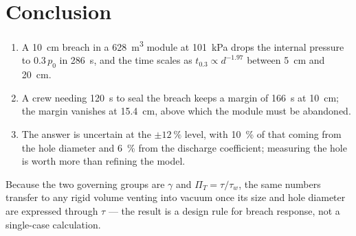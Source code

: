\section{Conclusion}
\label{sec:conclusion}

\begin{enumerate}[label=(\arabic*),leftmargin=*]
  \item A \SI{10}{cm} breach in a \SI{628}{m^3} module at \SI{101}{kPa}
        drops the internal pressure to $0.3\,p_0$ in \SI{286}{s}, and the
        time scales as $t_{0.3}\propto d^{-1.97}$ between \SI{5}{cm} and
        \SI{20}{cm}.
  \item A crew needing \SI{120}{s} to seal the breach keeps a margin of
        \SI{166}{s} at \SI{10}{cm}; the margin vanishes at
        \SI{15.4}{cm}, above which the module must be abandoned.
  \item The answer is uncertain at the $\pm\SI{12}{\percent}$ level, with
        \SI{10}{\percent} of that coming from the hole diameter and
        \SI{6}{\percent} from the discharge coefficient; measuring the
        hole is worth more than refining the model.
\end{enumerate}

Because the two governing groups are $\gamma$ and $\Pi_T=\tau/\tau_w$, the
same numbers transfer to any rigid volume venting into vacuum once its
size and hole diameter are expressed through $\tau$ --- the result is a
design rule for breach response, not a single-case calculation.

